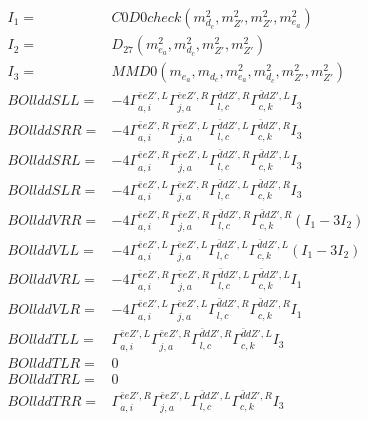 \documentclass[A4,landscape]{article}
\begin{document}
\begin{align} 
I_1 = & C0D0check(m^2_{d_{{c}}}, m^2_{{Z'}}, m^2_{{Z'}}, m^2_{e_{{a}}}) \\ 
I_2 = & D_{27}(m^2_{e_{{a}}}, m^2_{d_{{c}}}, m^2_{{Z'}}, m^2_{{Z'}}) \\ 
I_3 = & MMD0(m_{e_{{a}}}, m_{d_{{c}}}, m^2_{e_{{a}}}, m^2_{d_{{c}}}, m^2_{{Z'}}, m^2_{{Z'}}) \\ 
  BOllddSLL= & -4  \Gamma^{\bar{e}e {Z'} ,L}_{a, i} \Gamma^{\bar{e}e {Z'} ,R}_{j, a} \Gamma^{\bar{d}d {Z'} ,R}_{l, c} \Gamma^{\bar{d}d {Z'} ,L}_{c, k} I_3 \\ 
  BOllddSRR= & -4  \Gamma^{\bar{e}e {Z'} ,R}_{a, i} \Gamma^{\bar{e}e {Z'} ,L}_{j, a} \Gamma^{\bar{d}d {Z'} ,L}_{l, c} \Gamma^{\bar{d}d {Z'} ,R}_{c, k} I_3 \\ 
  BOllddSRL= & -4  \Gamma^{\bar{e}e {Z'} ,R}_{a, i} \Gamma^{\bar{e}e {Z'} ,L}_{j, a} \Gamma^{\bar{d}d {Z'} ,R}_{l, c} \Gamma^{\bar{d}d {Z'} ,L}_{c, k} I_3 \\ 
  BOllddSLR= & -4  \Gamma^{\bar{e}e {Z'} ,L}_{a, i} \Gamma^{\bar{e}e {Z'} ,R}_{j, a} \Gamma^{\bar{d}d {Z'} ,L}_{l, c} \Gamma^{\bar{d}d {Z'} ,R}_{c, k} I_3 \\ 
  BOllddVRR= & -4  \Gamma^{\bar{e}e {Z'} ,R}_{a, i} \Gamma^{\bar{e}e {Z'} ,R}_{j, a} \Gamma^{\bar{d}d {Z'} ,R}_{l, c} \Gamma^{\bar{d}d {Z'} ,R}_{c, k} (I_1 - 3 I_2) \\ 
  BOllddVLL= & -4  \Gamma^{\bar{e}e {Z'} ,L}_{a, i} \Gamma^{\bar{e}e {Z'} ,L}_{j, a} \Gamma^{\bar{d}d {Z'} ,L}_{l, c} \Gamma^{\bar{d}d {Z'} ,L}_{c, k} (I_1 - 3 I_2) \\ 
  BOllddVRL= & -4  \Gamma^{\bar{e}e {Z'} ,R}_{a, i} \Gamma^{\bar{e}e {Z'} ,R}_{j, a} \Gamma^{\bar{d}d {Z'} ,L}_{l, c} \Gamma^{\bar{d}d {Z'} ,L}_{c, k} I_1 \\ 
  BOllddVLR= & -4  \Gamma^{\bar{e}e {Z'} ,L}_{a, i} \Gamma^{\bar{e}e {Z'} ,L}_{j, a} \Gamma^{\bar{d}d {Z'} ,R}_{l, c} \Gamma^{\bar{d}d {Z'} ,R}_{c, k} I_1 \\ 
  BOllddTLL= &  \Gamma^{\bar{e}e {Z'} ,L}_{a, i} \Gamma^{\bar{e}e {Z'} ,R}_{j, a} \Gamma^{\bar{d}d {Z'} ,R}_{l, c} \Gamma^{\bar{d}d {Z'} ,L}_{c, k} I_3 \\ 
  BOllddTLR= & 0 \\ 
  BOllddTRL= & 0 \\ 
  BOllddTRR= &  \Gamma^{\bar{e}e {Z'} ,R}_{a, i} \Gamma^{\bar{e}e {Z'} ,L}_{j, a} \Gamma^{\bar{d}d {Z'} ,L}_{l, c} \Gamma^{\bar{d}d {Z'} ,R}_{c, k} I_3 \\ 
\end{align} 
\end{document}
